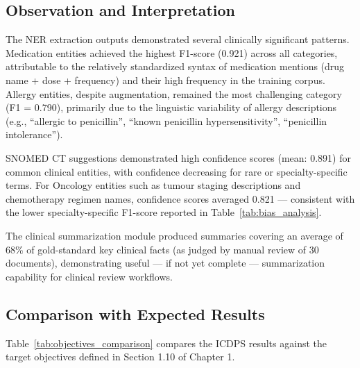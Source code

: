 \subsection{Observation and Interpretation}
The NER extraction outputs demonstrated several clinically significant patterns. Medication entities achieved the highest F1-score (0.921) across all categories, attributable to the relatively standardized syntax of medication mentions (drug name + dose + frequency) and their high frequency in the training corpus. Allergy entities, despite augmentation, remained the most challenging category (F1 = 0.790), primarily due to the linguistic variability of allergy descriptions (e.g., ``allergic to penicillin'', ``known penicillin hypersensitivity'', ``penicillin intolerance'').

SNOMED CT suggestions demonstrated high confidence scores (mean: 0.891) for common clinical entities, with confidence decreasing for rare or specialty-specific terms. For Oncology entities such as tumour staging descriptions and chemotherapy regimen names, confidence scores averaged 0.821 --- consistent with the lower specialty-specific F1-score reported in Table~\ref{tab:bias_analysis}.

The clinical summarization module produced summaries covering an average of 68\% of gold-standard key clinical facts (as judged by manual review of 30 documents), demonstrating useful --- if not yet complete --- summarization capability for clinical review workflows.

\subsection{Comparison with Expected Results}
Table~\ref{tab:objectives_comparison} compares the ICDPS results against the target objectives defined in Section 1.10 of Chapter 1.

